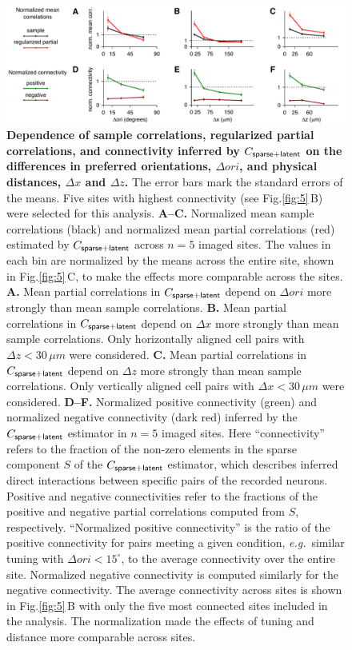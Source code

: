 \documentclass[10pt]{article}
\newcommand{\figref}[2]{Fig.\;\ref{fig:#1}\,#2}
\begin{document}
\begin{figure}[!ht]
    \begin{center}
        \includegraphics{./figures/Figure06.pdf}
    \end{center}
    \caption{{\bf Dependence of sample correlations, regularized partial correlations, and connectivity inferred by $C_{\sf sparse+latent}$ on the differences in preferred orientations, $\Delta ori$, and physical distances, $\Delta x$ and $\Delta z$.} The error bars mark the standard errors of the means. Five sites with highest connectivity (see \figref{5}{B}) were selected for this analysis.
    {\bf A--C.} Normalized mean sample correlations (black) and normalized mean partial correlations (red) estimated by $C_{\sf sparse+latent}$ across $n=5$ imaged sites. The values in each bin are normalized by the means across the entire site, shown in \figref{5}{C}, to make the effects more comparable across the sites.
    {\bf A.} Mean partial correlations in $C_{\sf sparse+latent}$ depend on $\Delta ori$ more strongly than mean sample correlations.
    {\bf B.} Mean partial correlations in $C_{\sf sparse+latent}$ depend on $\Delta x$ more strongly than mean sample correlations. Only horizontally aligned cell pairs with $\Delta z<30\,\mu m$ were considered.
    {\bf C.} Mean partial correlations in $C_{\sf sparse+latent}$ depend on $\Delta z$ more strongly than mean sample correlations. Only vertically aligned cell pairs with $\Delta x<30\,\mu m$ were considered.    {\bf D--F.} Normalized positive connectivity (green) and normalized negative connectivity (dark red) inferred by the $C_{\sf sparse+latent}$ estimator in $n=5$ imaged sites. 
    Here ``connectivity'' refers to the fraction of the non-zero elements in the sparse component $S$ of the $C_{\sf sparse+latent}$ estimator, which describes inferred direct interactions between specific pairs of the recorded neurons. Positive and negative connectivities refer to the fractions of the positive and negative partial correlations computed from  $S$, respectively.  ``Normalized positive connectivity'' is the ratio of the positive connectivity for pairs meeting a given condition, \emph{e.g.}~similar tuning with $\Delta ori <15^{\circ}$, to the average connectivity over the entire site.  Normalized negative connectivity is computed similarly for the negative connectivity.  The average connectivity across sites is shown in \figref{5}{B} with only the five most connected sites included in the analysis.  The normalization made the effects of tuning and distance more comparable across sites. 
}
\end{figure}
\end{document}
